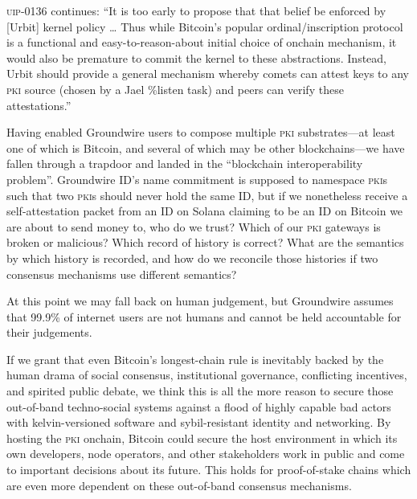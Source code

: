 \documentclass[twoside]{article}
\begin{document}
\textsc{uip}-0136 continues: ``It is too early to propose that that belief be
enforced by {[}Urbit{]} kernel policy \ldots{} Thus while Bitcoin's
popular ordinal/inscription protocol is a functional and
easy-to-reason-about initial choice of onchain mechanism, it would also
be premature to commit the kernel to these abstractions. Instead, Urbit
should provide a general mechanism whereby comets can attest keys to any
\textsc{pki} source (chosen by a Jael \%listen task) and peers can verify these
attestations.''

Having enabled Groundwire users to compose multiple \textsc{pki} substrates---at
least one of which is Bitcoin, and several of which may be other
blockchains---we have fallen through a trapdoor and landed in the
``blockchain interoperability problem''. Groundwire ID's name commitment
is supposed to namespace \textsc{pki}s such that two \textsc{pki}s should never hold the
same ID, but if we nonetheless receive a self-attestation packet from an
ID on Solana claiming to be an ID on Bitcoin we are about to send money
to, who do we trust? Which of our \textsc{pki} gateways is broken or malicious?
Which record of history is correct? What are the semantics by which
history is recorded, and how do we reconcile those histories if two
consensus mechanisms use different semantics?

At this point we may fall back on human judgement, but Groundwire
assumes that 99.9\% of internet users are not humans and cannot be held
accountable for their judgements.

If we grant that even Bitcoin's longest-chain rule is inevitably backed
by the human drama of social consensus, institutional governance,
conflicting incentives, and spirited public debate, we think this is all
the more reason to secure those out-of-band techno-social systems
against a flood of highly capable bad actors with kelvin-versioned
software and sybil-resistant identity and networking. By hosting the \textsc{pki}
onchain, Bitcoin could secure the host environment in which its own
developers, node operators, and other stakeholders work in public and
come to important decisions about its future. This holds for
proof-of-stake chains which are even more dependent on these out-of-band
consensus mechanisms.
\end{document}
